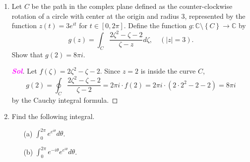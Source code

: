 \documentclass{article}
\theoremstyle{definition}
\newcommand{\set}[1]{\left\{#1\right\}}
\newcommand{\C}{\mathbb{C}}
\newcommand{\of}[1]{\left( #1 \right)}
\newcommand{\abs}[1]{\left\lvert #1 \right\rvert}
\newcommand{\sol}{\textcolor{magenta}{\bf Sol}}
\begin{document}
\begin{enumerate}
	Calculate the value of the following integral:
	\begin{itemize}
		\item[(a)] $\displaystyle\int_C\frac{e^z}{z}dz$\quad(b) $\displaystyle\int_C\frac{z^2}{z-1}dz$\quad(c) $\displaystyle\int_C\frac{z}{z-3}dz$\quad(d) $\displaystyle\int_C\frac{\cos z}{z\of{z^2+9}}dz$
	\end{itemize}
	\begin{proof}[\sol]
		\begin{itemize}
			\item[(a)] Let $f\of{z}=e^z$ then \[
			\oint_C\frac{e^z}{z}dz=\oint_C\frac{f\of{z}}{z-0}dz=2\pi i\cdot e^0 =2\pi i.
			\] by the Cauchy integral formula.
			\vspace{4pt}
			\item[(b)] Let $f\of{z}=z^2$ then \[
			\oint_C\frac{z^2}{z-1}dz=\oint_C\frac{f\of{z}}{z-1}dz=2\pi i\cdot(1)^2=2\pi i.
			\] by the Cauchy integral formula.
			\vspace{4pt}
			\item[(c)] Since $z_0=3$ is not inside the curve $C$, $\displaystyle
			\oint_C\frac{z}{z-3}dz=0
			$ by Cauchy-Goursat theorem.
			\vspace{4pt}
			\item[(d)] Let $f\of{z}=\displaystyle\frac{\cos z}{\of{z+3i}\of{z-3i}}$ then \[
			\oint_C\frac{\of{\cos z}}{z\of{z^2+9}}dz = 2\pi i\cdot \frac{\cos 0}{3i\cdot(-3i)}=\frac{2\pi i}{9}.
			\]
		\end{itemize}
	\end{proof}
	\item Let $C$ be the path in the complex plane defined as the counter-clockwise rotation of a circle with center at the origin and radius $3$, represented by the function $z(t) = 3e^{it}$ for $t \in [0, 2\pi]$. Define the function $g : \C \setminus\set{C} \to \mathbb{C}$ by \[
	g\of{z}=\int_C\frac{2\zeta^2-\zeta-2}{\zeta-z}d\zeta,\quad\of{\abs{z}=3}.
	\] Show that $g(2) = 8\pi i$.
	\begin{proof}[\sol]
		Let $f\of{\zeta}=2\zeta^2-\zeta-2$. Since $z=2$ is inside the curve $C$, \[
		g\of{2}=\oint_C\frac{2\zeta^2-\zeta-2}{\zeta-2}=2\pi i\cdot f\of{2}=2\pi i\cdot(2\cdot 2^2-2-2)=8\pi i
		\] by the Cauchy integral formula.
	\end{proof}
	\item Find the following integral. \begin{itemize}
		\item[(a)] $\displaystyle\int_0^{2\pi}e^{e^{i\theta}}d\theta$.
		\item[(b)] $\displaystyle\int_0^{2\pi}e^{-i\theta}e^{e^{i\theta}}d\theta$.

\end{itemize}
\end{enumerate}
\end{document}

